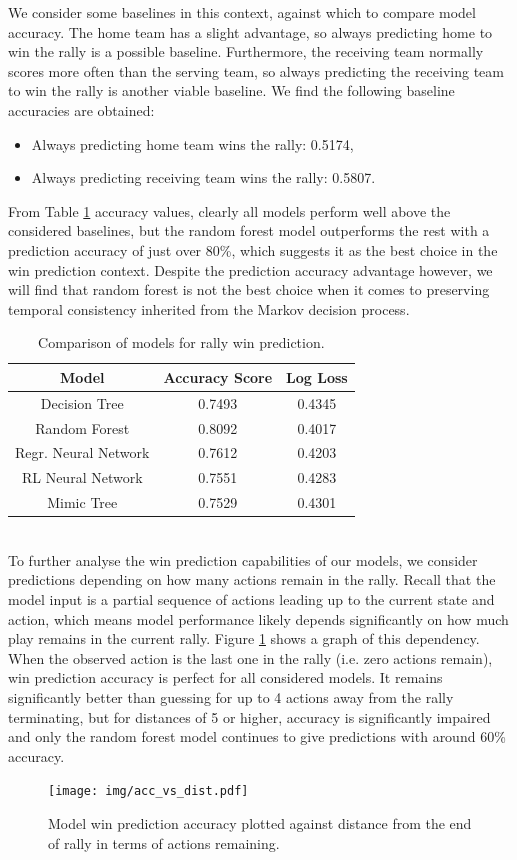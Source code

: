 \documentclass{sfuthesis}
\begin{document}
	We consider some baselines in this context, against which to compare model accuracy. The home team has a slight advantage, so always predicting home to win the rally is a possible baseline. Furthermore, the receiving team normally scores more often than the serving team, so always predicting the receiving team to win the rally is another viable baseline. We find the following baseline accuracies are obtained:
	\begin{itemize}
		\item Always predicting home team wins the rally: 0.5174,
		\item Always predicting receiving team wins the rally: 0.5807.
	\end{itemize}
	From Table \ref{tab:class_accuracy} accuracy values, clearly all models perform well above the considered baselines, but the random forest model outperforms the rest with a prediction accuracy of just over 80\%, which suggests it as the best choice in the win prediction context. Despite the prediction accuracy advantage however, we will find that random forest is not the best choice when it comes to preserving temporal consistency inherited from the Markov decision process.\\
	\begin{table}
		\centering
		\begin{tabular}{c|cc}
			\textbf{Model} & \textbf{Accuracy Score} & \textbf{Log Loss} \\ \hline
			Decision Tree  & 0.7493                  & 0.4345            \\
			Random Forest  & 0.8092                  & 0.4017            \\
			Regr. Neural Network & 0.7612                  & 0.4203        \\
			RL Neural Network & 0.7551                  & 0.4283            \\
			Mimic Tree     & 0.7529                  & 0.4301           
		\end{tabular}
		\caption{Comparison of models for rally win prediction.}
		\label{tab:class_accuracy}
	\end{table}
	\\To further analyse the win prediction capabilities of our models, we consider predictions depending on how many actions remain in the rally. Recall that the model input is a partial sequence of actions leading up to the current state and action, which means model performance likely depends significantly on how much play remains in the current rally. Figure \ref{fig:acc-vs-dist} shows a graph of this dependency. When the observed action is the last one in the rally (i.e. zero actions remain), win prediction accuracy is perfect for all considered models. It remains significantly better than guessing for up to 4 actions away from the rally terminating, but for distances of 5 or higher, accuracy is significantly impaired and only the random forest model continues to give predictions with around 60\% accuracy.
	\begin{figure}
		\texttt{[image: img/acc\_vs\_dist.pdf]}
		\caption{Model win prediction accuracy plotted against distance from the end of rally in terms of actions remaining.}
		\label{fig:acc-vs-dist}
	\end{figure}
	
\end{document}
